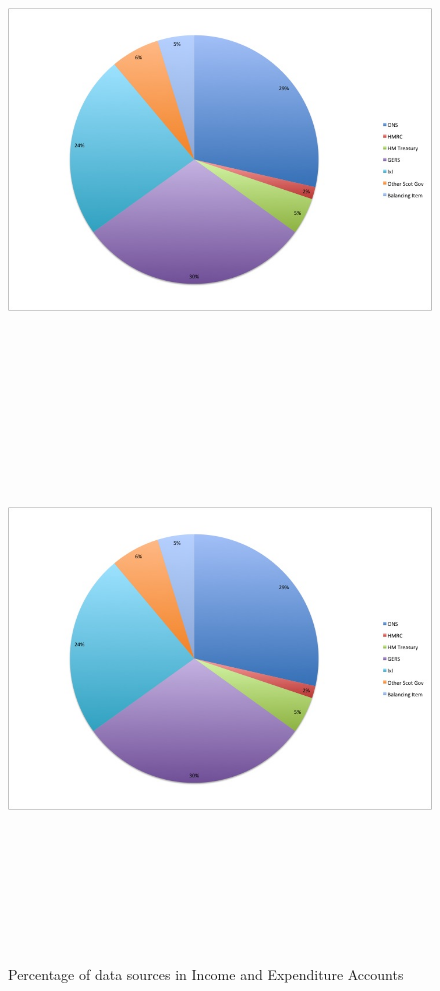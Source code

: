 \begin{figure}[!htbp]
  \begin{center}
       \ifpdf
         \includegraphics[height=4.3in,width=6in]{incexpsources}
       \else
         \includegraphics[bb = 92 86 545 742, height=6in]{incexpsources}
       \fi
    \caption{Percentage of data sources in Income and Expenditure Accounts}
    \label{incexpsources}
  \end{center} \label{fig:2.4.1}
\end{figure}


